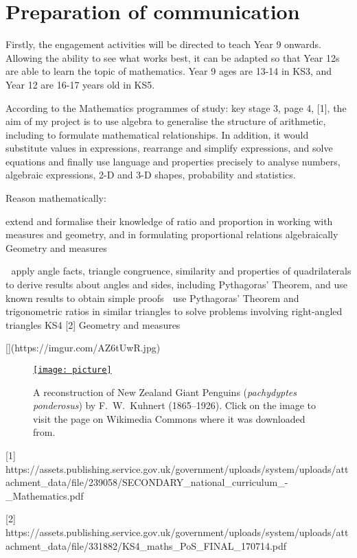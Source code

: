 \documentclass[12pt, a4paper,oneside]{book}
\numberwithin{equation}{section}
\begin{document}
\section{Preparation of communication}\label{sec:x.x}


Firstly, the engagement activities will be directed to teach Year 9 onwards. Allowing the ability to see what works best, it can be adapted so that Year 12s are able to learn the topic of mathematics. Year 9 ages are 13-14 in KS3, and Year 12 are 16-17 years old in KS5.

According to the Mathematics programmes of study: key stage 3, page 4, [1], the aim of my project is to use algebra to generalise the structure of arithmetic, including to formulate mathematical relationships. In addition, it would substitute values in expressions, rearrange and simplify expressions, and solve equations and finally use language and properties precisely to analyse numbers, algebraic expressions, 2-D and 3-D shapes, probability and statistics.

Reason mathematically:

extend and formalise their knowledge of ratio and proportion in working with measures and geometry, and in formulating proportional relations algebraically
Geometry and measures

 apply angle facts, triangle congruence, similarity and properties of quadrilaterals to derive results about angles and sides, including Pythagoras’ Theorem, and use known results to obtain simple proofs  use Pythagoras’ Theorem and trigonometric ratios in similar triangles to solve problems involving right-angled triangles
KS4 [2] Geometry and measures

[](https://imgur.com/AZ6tUwR.jpg)
\begin{figure}
  \href{http://commons.wikimedia.org/wiki/File:Pachydyptes_ponderosus.jpg}
       {\texttt{[image: picture]}}
  \caption{A reconstruction of New Zealand Giant Penguins (\emph{pachydyptes ponderosus}) by
    F.~W.~Kuhnert (1865--1926). Click on the image to visit the page on Wikimedia Commons where it
    was downloaded from.}
\end{figure}

[1] https://assets.publishing.service.gov.uk/government/uploads/system/uploads/attachment_data/file/239058/SECONDARY_national_curriculum_-_Mathematics.pdf

[2] https://assets.publishing.service.gov.uk/government/uploads/system/uploads/attachment_data/file/331882/KS4_maths_PoS_FINAL_170714.pdf
\end{document}
